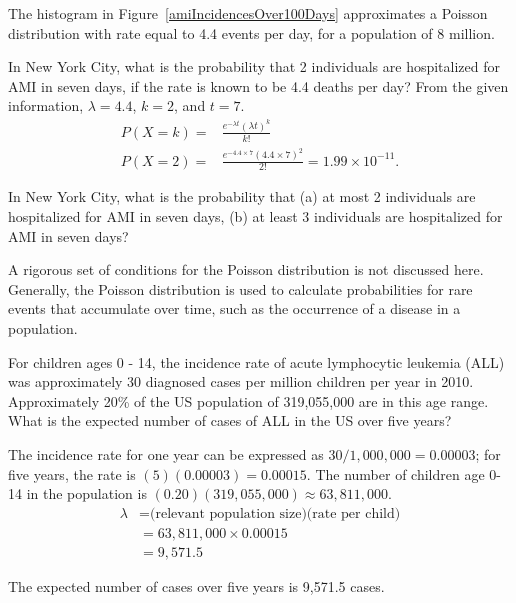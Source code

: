 The histogram in Figure~\ref{amiIncidencesOver100Days} approximates a Poisson distribution with rate equal to 4.4 events per day, for a population of 8 million. 

\textD{\newpage}

\begin{examplewrap}
\begin{nexample}{In New York City, what is the probability that 2 individuals are hospitalized for AMI in seven days, if the rate is known to be 4.4 deaths per day?}
From the given information, $\lambda = 4.4$, $k = 2$, and $t = 7$. 
\begin{align*}
P(X = k) =& \frac{e^{-\lambda t}(\lambda t)^{k}}{k!} \\
P(X = 2) =& \frac{e^{-4.4 \times 7}(4.4 \times 7)^{2}}{2!} = 1.99 \times 10^{-11}.
\end{align*}
\end{nexample}
\end{examplewrap}

\begin{exercisewrap}
\begin{nexercise}
In New York City, what is the probability that (a) at most 2 individuals are hospitalized for AMI in seven days, (b) at least 3 individuals are hospitalized for AMI in seven days?\footnotemark{}
\end{nexercise}
\end{exercisewrap}

A rigorous set of conditions for the Poisson distribution is not discussed here. Generally, the Poisson distribution is used to calculate probabilities for rare events that accumulate over time, such as the occurrence of a disease in a population.

\begin{examplewrap}
\begin{nexample}{For children ages 0 - 14, the incidence rate of acute lymphocytic leukemia (ALL) was approximately 30 diagnosed cases per million children per year in 2010. Approximately 20\% of the US population of 319,055,000 are in this age range. What is the expected number of cases of ALL in the US over five years?}

The incidence rate for one year can be expressed as $30/1,000,000 = 0.00003$; for five years, the rate is $(5)(0.00003) = 0.00015$. The number of children age 0-14 in the population is $(0.20)(319,055,000) \approx 63,811,000$. 
\begin{align*}
\lambda &= \text{(relevant population size)(rate per child)} \\
&= 63,811,000 \times 0.00015 \\
&= 9,571.5
\end{align*}
	
The expected number of cases over five years is 9,571.5 cases.
\end{nexample}
\end{examplewrap}

